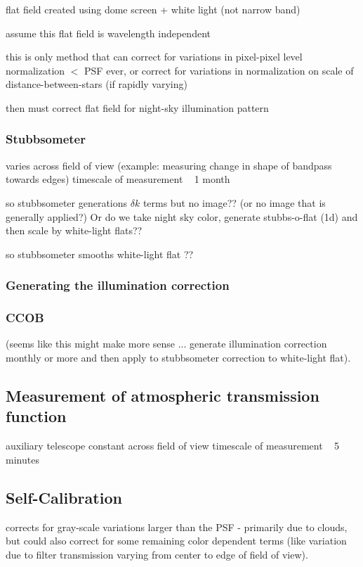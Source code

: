 \documentclass[12pt,preprint]{aastex}
\begin{document}
flat field created using dome screen + white light (not narrow band)

assume this flat field is wavelength independent

this is only method that can correct for variations in pixel-pixel
level normalization $<$ PSF ever, or correct for variations in
normalization on scale of distance-between-stars (if rapidly varying)

then must correct flat field for night-sky illumination pattern

\subsubsection{Stubbsometer}
varies across field of view (example: measuring change in shape of
bandpass towards edges)
timescale of measurement ~ 1 month

so stubbsometer generations $\delta k$ terms but no image?? 
(or no image that is generally applied?)
Or do we take night sky color, generate stubbs-o-flat (1d) and then
scale by white-light flats??

so stubbsometer smooths white-light flat ??

\subsubsection{Generating the illumination correction}

\subsubsection{CCOB}
(seems like this might make more sense ... generate illumination
correction monthly or more and then apply to stubbsometer correction
to white-light flat).



\subsection{Measurement of atmospheric transmission function}

auxiliary telescope
constant across field of view
timescale of measurement ~ 5 minutes


\subsection{Self-Calibration}
\label{selfcalib}

corrects for gray-scale variations larger than the PSF - primarily due to clouds,
but could also correct for some remaining color dependent terms (like variation
due to filter transmission varying from center to edge of field of view).
\end{document}
